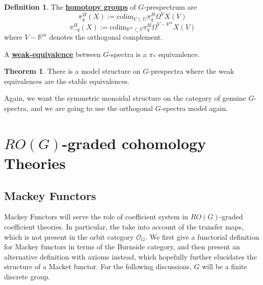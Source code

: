 \documentclass{article}
\theoremstyle{definition}
\newtheorem{theorem}{Theorem}[section]
\theoremstyle{definition}
\newtheorem{definition}{Definition}[theorem]
\theoremstyle{definition}
\theoremstyle{definition}
\theoremstyle{definition}
\theoremstyle{definition}
\theoremstyle{definition}
\begin{document}
\begin{tcolorbox}[colback=purple!5!white,colframe=purple!75!black]
\begin{definition}
The \underline{\textbf{homotopy groups}} of $G$-prespectrum are 
\[\pi_q^H(X):=\textrm{colim}_{V\subset U}\pi_q^H\Omega^VX(V)\]
\[\pi_{-q}^H(X):=\textrm{colim}_{\mathbb{R}^m\subset V}\pi_q^H\Omega^{V-\mathbb{R}^m}X(V)\]
where $V-\mathbb{R}^m$ denotes the orthogonal complement. 

A \underline{\textbf{weak-equivalence}} between $G$-spectra is a $\pi_*$ equivanlence. 
\end{definition}
\end{tcolorbox}


\begin{tcolorbox}[colback=red!5!white,colframe=red!30!white]
\begin{theorem}
There is a model structure on $G$-prespectra where the weak equivalences are the stable equivalences. 
\end{theorem}
\end{tcolorbox}
Again, we want the symmetric monoidal structure on the category of genuine $G$-spectra, and we are going to use the orthogonal $G$-spectra model again. 














\section{$RO(G)$-graded cohomology Theories}
\subsection{Mackey Functors}
Mackey Functors will serve the role of coefficient system in $RO(G)$-graded coefficient theories. In particular, the take into account of the transfer maps, which is not present in the orbit category $\mathcal{O}_G$. We first give a functorial definition for Mackey functors in terms of the Burnside category, and then present an alternative definition with axioms instead, which hopefully further elucidates the structure of a Macket functor. For the following discussions, $G$ will be a finite discrete group.
\end{document}

